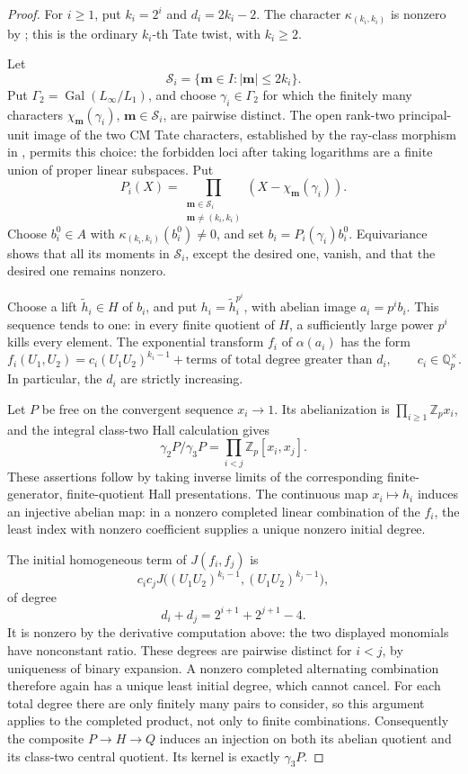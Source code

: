 \begin{proof}
For \(i\ge1\), put \(k_i=2^i\) and
\(d_i=2k_i-2\).  The character
\(\kappa_{(k_i,k_i)}\) is nonzero by
\cite[Theorem 2.8(2) and the Soul\'e-finiteness paragraph,
p.~9]{Ishii}; this is the ordinary \(k_i\)-th
Tate twist, with \(k_i\ge2\).

Let
\[
 \mathcal S_i=\{\boldsymbol m\in I:
                              |\boldsymbol m|\le2k_i\}.
\]
Put \(\Gamma_2=\operatorname{Gal}(L_\infty/L_1)\), and choose \(\gamma_i\in\Gamma_2\) for which the finitely
many characters \(\chi_{\boldsymbol m}(\gamma_i)\),
\(\boldsymbol m\in\mathcal S_i\), are pairwise distinct.
The open rank-two principal-unit image of the two CM
Tate characters, established by the ray-class morphism
in \cite[pp.~4--5]{Ishii}, permits this choice:
the forbidden loci after taking logarithms are a finite
union of proper linear subspaces.  Put
\[
 P_i(X)=\prod_{\substack{\boldsymbol m\in\mathcal S_i\\
                         \boldsymbol m\ne(k_i,k_i)}}
                 (X-\chi_{\boldsymbol m}(\gamma_i)).
\]
Choose \(b_i^0\in A\) with
\(\kappa_{(k_i,k_i)}(b_i^0)\ne0\), and set
\(b_i=P_i(\gamma_i)b_i^0\).  Equivariance shows that
all its moments in \(\mathcal S_i\), except the desired
one, vanish, and that the desired one remains nonzero.

Choose a lift \(\widetilde h_i\in H\) of \(b_i\), and
put \(h_i=\widetilde h_i^{p^i}\), with abelian image
\(a_i=p^ib_i\).  This sequence tends to one: in every
finite quotient of \(H\), a sufficiently large power
\(p^i\) kills every element.  The exponential transform
\(f_i\) of \(\alpha(a_i)\) has the form
\[
 f_i(U_1,U_2)=c_i(U_1U_2)^{k_i-1}
                    +\text{terms of total degree greater than }d_i,
 \qquad c_i\in\mathbb Q_p^\times.
\]
In particular, the \(d_i\) are strictly increasing.

Let \(P\) be free on the convergent sequence
\(x_i\to1\).  Its abelianization is
\(\prod_{i\ge1}\mathbb Z_p x_i\), and the integral
class-two Hall calculation gives
\[
 \gamma_2P/\gamma_3P
       =\prod_{i<j}\mathbb Z_p[x_i,x_j].
\]
These assertions follow by taking inverse limits of
the corresponding finite-generator, finite-quotient
Hall presentations.  The continuous map \(x_i\mapsto h_i\)
induces an injective abelian map: in a nonzero completed
linear combination of the \(f_i\), the least index
with nonzero coefficient supplies a unique nonzero
initial degree.

The initial homogeneous term of \(J(f_i,f_j)\) is
\[
 c_ic_j J\bigl((U_1U_2)^{k_i-1},
              (U_1U_2)^{k_j-1}\bigr),
\]
of degree
\[
 d_i+d_j=2^{i+1}+2^{j+1}-4.
\]
It is nonzero by the derivative computation above:
the two displayed monomials have nonconstant ratio.
These degrees are pairwise distinct for \(i<j\), by
uniqueness of binary expansion.  A nonzero completed
alternating combination therefore again has a unique
least initial degree, which cannot cancel.
For each total degree there are only finitely many
pairs to consider, so this argument applies to the
completed product, not only to finite combinations.
Consequently the composite
\(P\to H\to Q\) induces an injection on both its
abelian quotient and its class-two central quotient.
Its kernel is exactly \(\gamma_3P\).


\end{proof}
